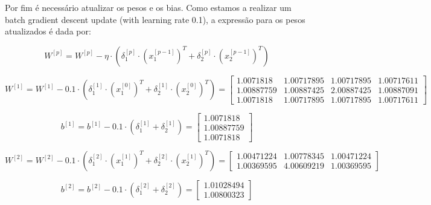 \documentclass[a4paper,12pt]{article} %
\begin{document}
\begin{enumerate}
Por fim é necessário atualizar os pesos e os bias. Como estamos a realizar um batch gradient descent update (with learning rate 0.1), a expressão para os pesos atualizados é dada por:

\begin{equation*}
    W^{[p]} = W^{[p]} - \eta \cdot (\delta^{[p]}_1 \cdot (x^{[p-1]}_1)^T + \delta^{[p]}_2 \cdot (x^{[p-1]}_2)^T)
\end{equation*}

\begin{equation*}
    W^{[1]} = W^{[1]} - 0.1 \cdot (\delta^{[1]}_1 \cdot (x^{[0]}_1)^T + \delta^{[1]}_2 \cdot (x^{[0]}_2)^T) = \begin{bmatrix} 1.0071818 & 1.00717895 & 1.00717895 & 1.00717611 \\
                                                                                                                            1.00887759 & 1.00887425 & 2.00887425 & 1.00887091 \\
                                                                                                                            1.0071818 & 1.00717895 & 1.00717895 & 1.00717611 \end{bmatrix}
\end{equation*}

\begin{equation*}
    b^{[1]} = b^{[1]} - 0.1 \cdot (\delta^{[1]}_1 + \delta^{[1]}_2) = \begin{bmatrix} 1.0071818 \\ 1.00887759 \\ 1.0071818 \end{bmatrix}
\end{equation*}

\begin{equation*}
    W^{[2]} = W^{[2]} - 0.1 \cdot (\delta^{[2]}_1 \cdot (x^{[1]}_1)^T + \delta^{[2]}_2 \cdot (x^{[1]}_2)^T) = \begin{bmatrix} 1.00471224 & 1.00778345 & 1.00471224 \\
                                                                                                                            1.00369595 & 4.00609219 & 1.00369595 \end{bmatrix}
\end{equation*}

\begin{equation*}
    b^{[2]} = b^{[2]} - 0.1 \cdot (\delta^{[2]}_1 + \delta^{[2]}_2) = \begin{bmatrix} 1.01028494 \\ 1.00800323 \end{bmatrix}
\end{equation*}


\end{enumerate}
\end{document}
